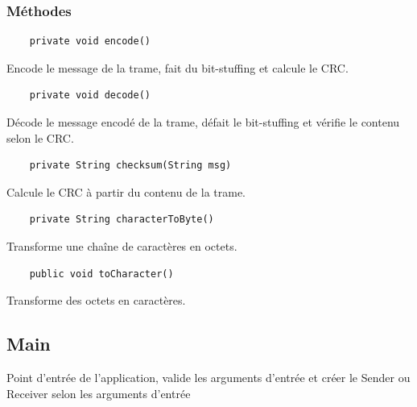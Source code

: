 \documentclass[a4paper,12pt]{article}
\begin{document}
\begin{spacing}{1}
	\subsubsection*{Méthodes}
	\begin{lstlisting}
	private void encode()
	\end{lstlisting}
	Encode le message de la trame, fait du bit-stuffing et calcule le CRC.
	\begin{lstlisting}
	private void decode()
	\end{lstlisting}
	Décode le message encodé de la trame, défait le bit-stuffing et vérifie le contenu selon le CRC.
	\begin{lstlisting}
	private String checksum(String msg)
	\end{lstlisting}
	Calcule le CRC à partir du contenu de la trame.
	\begin{lstlisting}
	private String characterToByte()
	\end{lstlisting}
	Transforme une chaîne de caractères en octets.
	\begin{lstlisting}
	public void toCharacter()
	\end{lstlisting}
	Transforme des octets en caractères.
	\end{spacing}
	\subsection*{Main}
	Point d'entrée de l'application, valide les arguments d'entrée et créer le Sender ou Receiver selon les arguments d'entrée
\end{document}
